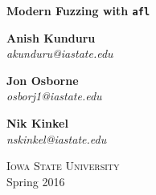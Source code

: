 \begin{titlepage}

\begin{center}

\Huge \textbf {Modern Fuzzing with \texttt{afl}}\\[0.5in]

\vspace{.1in}

\normalsize
\textbf{Anish Kunduru} \\
\textit{akunduru@iastate.edu} \\
\vspace{0.2cm}

\textbf{Jon Osborne} \\
\textit{osborj1@iastate.edu} \\
\vspace{0.2cm}

\textbf{Nik Kinkel} \\
\textit{nskinkel@iastate.edu} \\

\vfill

\textsc{Iowa State University}\\
\vspace{0.2cm}
Spring 2016

\end{center}

\end{titlepage}
